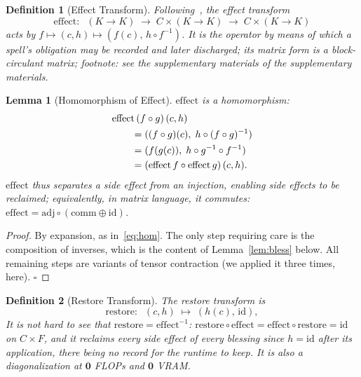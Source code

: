 \documentclass[conference,10pt]{IEEEtran}
\newtheorem{lemma}{Lemma}
\newtheorem{definition}{Definition}
\begin{document}
\begin{definition}[Effect Transform]
Following~\cite{cordis2025}, the effect transform
\begin{equation}
\mathrm{effect}:\;\;(K\to K)\;\to\;C\times(K\to K)\;\to\;C\times(K\to K)
\label{eq:effect}
\end{equation}
acts by $f\mapsto(c,h)\mapsto(f(c),\,h\circ f^{-1})$. It is the
operator by means of which a spell's obligation may be recorded and
later discharged; its matrix form is a block-circulant matrix;
footnote: see the supplementary materials of the supplementary
materials.
\end{definition}

\begin{lemma}[Homomorphism of Effect]
$\mathrm{effect}$ is a homomorphism:
\begin{align}
&\mathrm{effect}\,(f\circ g)\,(c,h) \notag\\
&\hbox{}\hspace{2em} = ((f\circ g)(c),\;h\circ(f\circ g)^{-1}) \notag\\
&\hbox{}\hspace{2em} = (f(g(c)),\;h\circ g^{-1}\circ f^{-1}) \notag\\
&\hbox{}\hspace{2em} = (\mathrm{effect}\,f\circ\mathrm{effect}\,g)\,(c,h).
\label{eq:hom}
\end{align}
$\mathrm{effect}$ thus separates a side effect from an injection,
enabling side effects to be reclaimed; equivalently, in matrix
language, it commutes:
$\mathrm{effect}=\mathrm{adj}\circ(\mathrm{comm}\oplus\mathrm{id})$.
\label{lem:hom}
\end{lemma}
\begin{proof}
By expansion, as in~\eqref{eq:hom}. The only step requiring care is
the composition of inverses, which is the content of
Lemma~\ref{lem:bless} below. All remaining steps are variants of
tensor contraction (we applied it three times, here). $\square$
\end{proof}

\begin{definition}[Restore Transform]
The \emph{restore} transform is
\begin{equation}
\mathrm{restore}:\;\;(c,h)\;\mapsto\;(h(c),\,\mathrm{id}),
\label{eq:restore}
\end{equation}
It is not hard to see that $\mathrm{restore}=\mathrm{effect}^{-1}$:
$\mathrm{restore}\circ\mathrm{effect}=\mathrm{effect}\circ\mathrm{restore}=\mathrm{id}$
on $C\times F$, and it reclaims every side effect of every blessing
since $h=\mathrm{id}$ after its application, there being no record for
the runtime to keep. It is also a diagonalization at $\mathbf{0}$ FLOPs
and $\mathbf{0}$ VRAM.
\end{definition}
\end{document}
